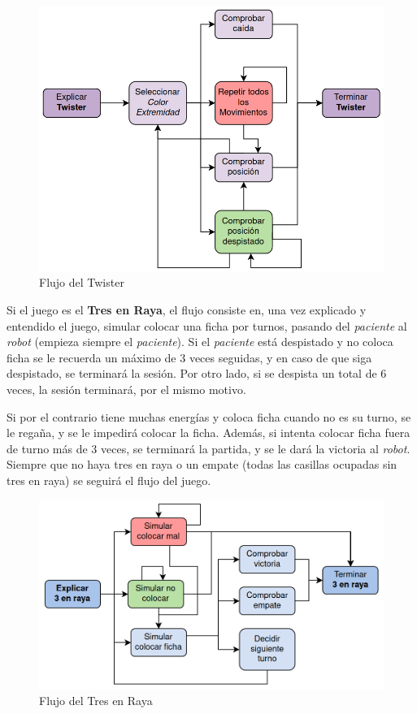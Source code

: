 \documentclass{uc3mpracticas}
\begin{document}
  \begin{figure}[!h]
    \centering
    \includegraphics[width=.6\linewidth]{Images/flujo2.png}
    \caption*{Flujo del Twister}
  \end{figure}

  \newpage

  Si el juego es el \textbf{Tres en Raya}, el flujo consiste en, una vez explicado y entendido el juego, simular colocar una ficha por turnos, pasando del \textit{paciente} al \textit{robot} (empieza siempre el \textit{paciente}). Si el \textit{paciente} está despistado y no coloca ficha se le recuerda un máximo de 3 veces seguidas, y en caso de que siga despistado, se terminará la sesión. Por otro lado, si se despista un total de 6 veces, la sesión terminará, por el mismo motivo.

  \vspace{2mm}

  Si por el contrario tiene muchas energías y coloca ficha cuando no es su turno, se le regaña, y se le impedirá colocar la ficha. Además, si intenta colocar ficha fuera de turno más de 3 veces, se terminará la partida, y se le dará la victoria al \textit{robot}. Siempre que no haya tres en raya o un empate (todas las casillas ocupadas sin tres en raya) se seguirá el flujo del juego.

  \begin{figure}[!h]
    \centering
    \includegraphics[width=.65\linewidth]{Images/flujo3.png}
    \caption*{Flujo del Tres en Raya}
  \end{figure}
\end{document}
